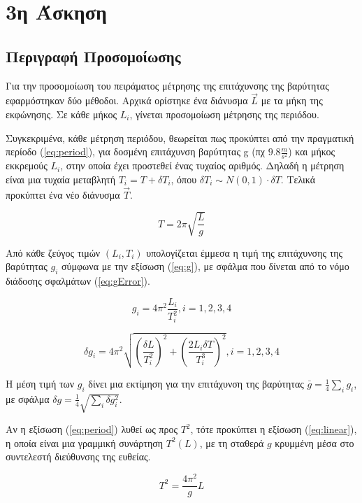 \documentclass[assignment1.tex]{subfiles}
\begin{document}
\section*{3η Άσκηση}


\subsection*{Περιγραφή Προσομοίωσης}
Για την προσομοίωση του πειράματος μέτρησης της επιτάχυνσης της βαρύτητας εφαρμόστηκαν δύο μέθοδοι. Αρχικά ορίστηκε ένα διάνυσμα $\vec{L}$ με τα μήκη της εκφώνησης. Σε κάθε μήκος $L_i$, γίνεται προσομοίωση μέτρησης της περιόδου. 

Συγκεκριμένα, κάθε μέτρηση περιόδου, θεωρείται πως προκύπτει από την πραγματική περίοδο (\ref{eq:period}), για δοσμένη επιτάχυνση βαρύτητας \textlatin{g} (πχ $9.8\frac{m}{s^2}$) και μήκος εκκρεμούς $L_i$, στην οποία έχει προστεθεί ένας τυχαίος αριθμός. Δηλαδή η μέτρηση είναι μια τυχαία μεταβλητή $T_i = T + \delta T_i$, όπου $\delta T_i \sim N(0,1)\cdot \delta T$. Τελικά προκύπτει ένα νέο διάνυσμα $\vec{T}$.

\begin{equation}
T = 2\pi \sqrt{\frac{L}{g}}
\label{eq:period}
\end{equation}

Από κάθε ζεύγος τιμών $(L_i, T_i)$ υπολογίζεται έμμεσα η τιμή της επιτάχυνσης της βαρύτητας $g_i$ σύμφωνα με την εξίσωση (\ref{eq:g}), με σφάλμα που δίνεται από το νόμο διάδοσης σφαλμάτων (\ref{eq:gError}).

\begin{equation}
g_i = 4\pi^2 \frac{L_i}{T_i^2}, i=1,2,3,4
\label{eq:g}
\end{equation}

\begin{equation}
\delta g_i = 4\pi^2 \sqrt{\left(\frac{\delta L}{T_i^2}\right)^2 + \left(\frac{2L_i\delta T}{T_i^3}\right)^2}, i=1,2,3,4
\label{eq:gError}
\end{equation}

Η μέση τιμή των $g_i$ δίνει μια εκτίμηση για την επιτάχυνση της βαρύτητας $\bar{g}=\frac{1}{4}\sum_i g_i$, με σφάλμα $\delta g = \frac{1}{4}\sqrt{\sum_i \delta g_i^2}$.

Αν η εξίσωση (\ref{eq:period}) λυθεί ως προς $T^2$, τότε προκύπτει η εξίσωση (\ref{eq:linear}), η οποία είναι μια γραμμική συνάρτηση $T^2(L)$, με τη σταθερά $g$ κρυμμένη μέσα στο συντελεστή διεύθυνσης της ευθείας. 

\begin{equation}
T^2 = \frac{4\pi^2}{g}L
\label{eq:linear}
\end{equation}
\end{document}
